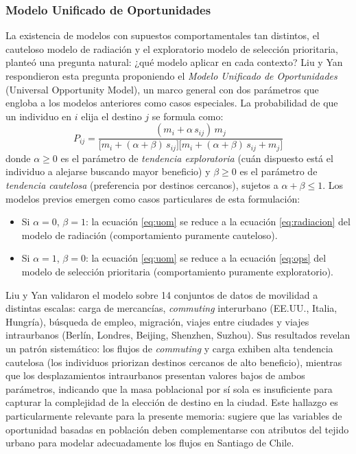 \subsubsection{Modelo Unificado de Oportunidades}

La existencia de modelos con supuestos comportamentales tan distintos, el cauteloso modelo de radiación y el exploratorio modelo de selección prioritaria, planteó una pregunta natural: ¿qué modelo aplicar en cada contexto? Liu y Yan \cite{liu2020intervening} respondieron esta pregunta proponiendo el \textit{Modelo Unificado de Oportunidades} (Universal Opportunity Model), un marco general con dos parámetros que engloba a los modelos anteriores como casos especiales. La probabilidad de que un individuo en $i$ elija el destino $j$ se formula como:
\begin{equation}
    P_{ij} = \frac{(m_i + \alpha\, s_{ij})\, m_j}{\bigl[m_i + (\alpha + \beta)\, s_{ij}\bigr]\bigl[m_i + (\alpha + \beta)\, s_{ij} + m_j\bigr]}
    \label{eq:uom}
\end{equation}
donde $\alpha \geq 0$ es el parámetro de \textit{tendencia exploratoria} (cuán dispuesto está el individuo a alejarse buscando mayor beneficio) y $\beta \geq 0$ es el parámetro de \textit{tendencia cautelosa} (preferencia por destinos cercanos), sujetos a $\alpha + \beta \leq 1$. Los modelos previos emergen como casos particulares de esta formulación:

\begin{itemize}
    \item Si $\alpha = 0$, $\beta = 1$: la ecuación \eqref{eq:uom} se reduce a la ecuación \eqref{eq:radiacion} del modelo de radiación (comportamiento puramente cauteloso).
    \item Si $\alpha = 1$, $\beta = 0$: la ecuación \eqref{eq:uom} se reduce a la ecuación \eqref{eq:ops} del modelo de selección prioritaria (comportamiento puramente exploratorio).
\end{itemize}

Liu y Yan \cite{liu2020intervening} validaron el modelo sobre 14 conjuntos de datos de movilidad a distintas escalas: carga de mercancías, \textit{commuting} interurbano (EE.UU., Italia, Hungría), búsqueda de empleo, migración, viajes entre ciudades y viajes intraurbanos (Berlín, Londres, Beijing, Shenzhen, Suzhou). Sus resultados revelan un patrón sistemático: los flujos de \textit{commuting} y carga exhiben alta tendencia cautelosa (los individuos priorizan destinos cercanos de alto beneficio), mientras que los desplazamientos intraurbanos presentan valores bajos de ambos parámetros, indicando que la masa poblacional por sí sola es insuficiente para capturar la complejidad de la elección de destino en la ciudad. Este hallazgo es particularmente relevante para la presente memoria: sugiere que las variables de oportunidad basadas en población deben complementarse con atributos del tejido urbano para modelar adecuadamente los flujos en Santiago de Chile.

